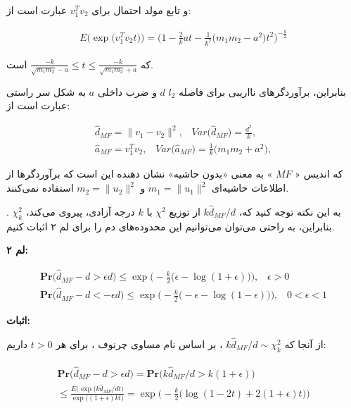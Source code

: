 و تابع مولد احتمال برای 
$v_1^T v_2$
عبارت است از:

\begin{align}
E \big( \exp \big( v_1^T v_2 t \big) \big)
 = \bigg(  1 - \frac{2}{k} at - \frac{1}{k^2} \big( m_1 m_2 - a^2 \big) t^2 \bigg)^{- \frac{k}{2}}
\label{eq:1iB}
\end{align}

که 
$\frac{-k}{\sqrt{m_1 m_2} - a} \leq t \leq \frac{-k}{\sqrt{m_1 m_2} + a}$
است.

بنابراین، برآوردگرهای نااریبی برای فاصله 
$l_2$
$d$
و ضرب داخلی
$a$
به شکل سر راستی عبارت است از:

\begin{align}
\hat{d}_{MF} = \| v_1 - v_2 \|^2, \;\;\; \mathit{Var} \Big( \hat{d}_{MF} \Big) = \frac{d^2}{k}, \label{eq:1iC}\\
\hat{a}_{MF} = v_1^T v_2, \;\;\; \mathit{Var} \big( \hat{a}_{MF} \big) = \frac{1}{k} \big( m_1 m_2 + a^2 \big), \label{eq:1iD}
\end{align}

که اندیس «
$MF$
» به معنی «بدون حاشیه»%
نشان دهنده این است که برآوردگرها از اطلاعات حاشیه‌ای 
$m_1 = \| u_1 \|^2$
و 
$m_2 = \| u_2 \|^2$
استفاده نمی‌کنند.

به این نکته توجه کنید که، 
$k \hat{d}_{MF} / d$
از توزیع 
$\chi^2$
با 
$k$
درجه آزادی، پیروی می‌کند،
$\chi_k^2$
. بنابراین، به راحتی می‌توان می‌توانیم این محدوده‌‌های دم را برای لم ۲ اثبات کنیم.

\textbf{
لم ۲:
}

\begin{align}
\mathbf{Pr} \big( \hat{d}_{MF} - d > \epsilon d) \leq \exp \Bigg( - \frac{k}{2} \big( \epsilon - \log( 1+ \epsilon) \big) \Bigg), \;\;\; \epsilon > 0 
\label{eq:1iE} \\
\mathbf{Pr} \big( \hat{d}_{MF} - d < -\epsilon d) \leq \exp \Bigg( - \frac{k}{2} \big( -\epsilon - \log( 1 - \epsilon) \big) \Bigg), \;\;\; 0 < \epsilon < 1 
\label{eq:1iF} 
\end{align}

\textbf{
اثبات:
}

از آنجا که 
$k \hat{d}_{MF} / d \sim \chi_k^2 $
، بر اساس نام مساوی چرنوف%
\cite{litez46}
، برای هر 
$t > 0$ 
داریم:

\begin{align}
\begin{split}
\mathbf{Pr} \big( \hat{d}_{MF} - d > \epsilon d) = 
\mathbf{Pr} \big( k \hat{d}_{MF} / d > k(1+\epsilon) \big) \\
\leq 
\frac{E\bigg( \exp (k \hat{d}_{MF} /dt \bigg) }{\exp \big( (1+\epsilon ) kt \big) } =
\exp \Bigg( - \frac{k}{2} \big( \log (1-2t) + 2(1 + \epsilon) t \big) \Bigg)
\end{split}
\label{eq:1iG}
\end{align}

